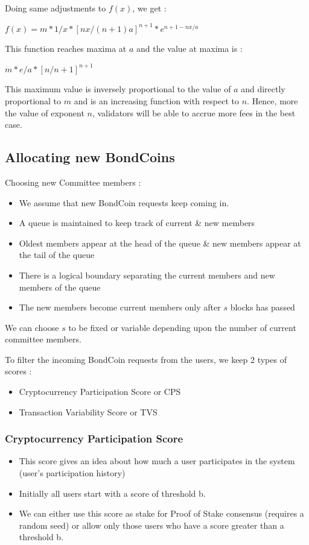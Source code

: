 Doing same adjustments to $f(x)$, we get : \\
\centerline{$f(x) = m*{1/x}*[nx/{(n+1)a}]^{n+1}*e^{n+1-nx/a}$}

This function reaches maxima at $a$ and the value at maxima is :\\
\centerline{$m*{e/a}*[n/{n+1}]^{n+1}$}

This maximum value is inversely proportional to the value of $a$ and directly proportional to $m$ and is an increasing function with respect to $n$. Hence, more the value of exponent $n$, validators will be able to accrue more fees in the best case.

\subsection{Allocating new BondCoins}

Choosing new Committee members :
\begin{itemize}
    \item We assume that new BondCoin requests keep coming in.
    \item A queue is maintained to keep track of current \& new members
    \item Oldest members appear at the head of the queue \& new members appear at the tail of the queue
    \item There is a logical boundary separating the current members and new members of the queue
    \item The new members become current members only after $s$ blocks has passed
\end{itemize}

We can choose $s$ to be fixed or variable depending upon the number of current committee members.

To filter the incoming BondCoin requests from the users, we keep 2 types of scores :
\begin{itemize}
    \item Cryptocurrency Participation Score or CPS
    \item Transaction Variability Score or TVS
\end{itemize}

\subsubsection{Cryptocurrency Participation Score}

\begin{itemize}
    \item This score gives an idea about how much a user participates in the system (user's participation history)
    \item Initially all users start with a score of threshold b.
    \item We can either use this score as stake for Proof of Stake consensus (requires a random seed) or allow only those users who have a score greater than a threshold b.
\end{itemize}

